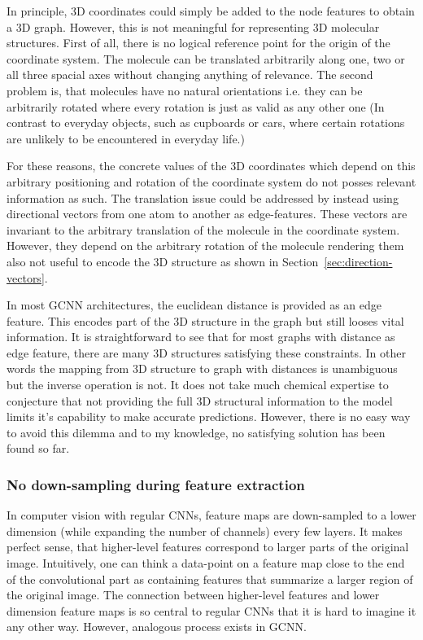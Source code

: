 In principle, 3D coordinates could simply be added to the node features to obtain a 3D graph. However, this is not meaningful for representing 3D molecular structures. First of all, there is no logical reference point for the origin of the coordinate system. The molecule can be translated arbitrarily along one, two or all three spacial axes without changing anything of relevance. The second problem is, that molecules have no natural orientations i.e. they can be arbitrarily rotated where every rotation is just as valid as any other one (In contrast to everyday objects, such as cupboards or cars, where certain rotations are unlikely to be encountered in everyday life.)

For these reasons, the concrete values of the 3D coordinates which depend on this arbitrary positioning and rotation of the coordinate system do not posses relevant information as such. The translation issue could be addressed by instead using directional vectors from one atom to another as edge-features. These vectors are invariant to the arbitrary translation of the molecule in the coordinate system. However, they depend on the arbitrary rotation of the molecule rendering them also not useful to encode the 3D structure as shown in Section~\ref{sec:direction-vectors}.

In most GCNN architectures, the euclidean distance is provided as an edge feature. This encodes part of the 3D structure in the graph but still looses vital information. It is straightforward to see that for most graphs with distance as edge feature, there are many 3D structures satisfying these constraints. In other words the mapping from 3D structure to graph with distances is unambiguous but the inverse operation is not. It does not take much chemical expertise to conjecture that not providing the full 3D structural information to the model limits it's capability to make accurate predictions. However, there is no easy way to avoid this dilemma and to my knowledge, no satisfying solution has been found so far.


\subsubsection{No down-sampling during feature extraction}

In computer vision with regular CNNs, feature maps are down-sampled to a lower dimension (while expanding the number of channels) every few layers. It makes perfect sense, that higher-level features correspond to larger parts of the original image. Intuitively, one can think a data-point on a feature map close to the end of the convolutional part as containing features that summarize a larger region of the original image. The connection between higher-level features and lower dimension feature maps is so central to regular CNNs that it is hard to imagine it any other way. However, analogous process exists in GCNN.


